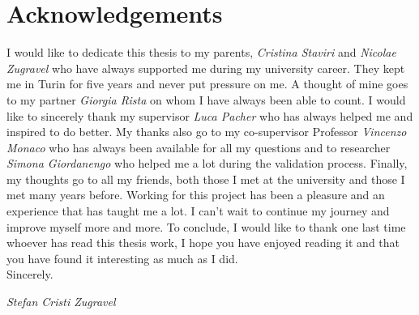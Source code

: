 \chapter*{Acknowledgements}
\vspace*{3cm}
\noindent I would like to dedicate this thesis to my parents, \textit{Cristina Staviri} and \textit{Nicolae Zugravel} who have always supported me during my university career.
They kept me in Turin for five years and never put pressure on me.
A thought of mine goes to my partner \textit{Giorgia Rista} on whom I have always been able to count.
I would like to sincerely thank my supervisor \textit{Luca Pacher} who has always helped me and inspired to do better.
My thanks also go to my co-supervisor Professor \textit{Vincenzo Monaco} who has always been available for all my questions and to researcher \textit{Simona Giordanengo} who helped me a lot during the validation process.
Finally, my thoughts go to all my friends, both those I met at the university and those I met many years before.
Working for this project has been a pleasure and an experience that has taught me a lot.
I can't wait to continue my journey and improve myself more and more.
To conclude, I would like to thank one last time whoever has read this thesis work, I hope you have enjoyed reading it and that you have found it interesting as much as I did.\\
\noindent Sincerely.
\vspace*{1cm}
\begin{flushright}
	\textit{Stefan Cristi Zugravel}
\end{flushright}